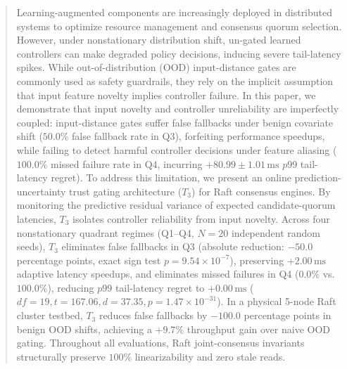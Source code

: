 \begin{abstract}
Learning-augmented components are increasingly deployed in distributed systems to optimize resource management and consensus quorum selection. However, under nonstationary distribution shift, un-gated learned controllers can make degraded policy decisions, inducing severe tail-latency spikes. While out-of-distribution (OOD) input-distance gates are commonly used as safety guardrails, they rely on the implicit assumption that input feature novelty implies controller failure. In this paper, we demonstrate that input novelty and controller unreliability are imperfectly coupled: input-distance gates suffer false fallbacks under benign covariate shift ($50.0\%$ false fallback rate in Q3), forfeiting performance speedups, while failing to detect harmful controller decisions under feature aliasing ($100.0\%$ missed failure rate in Q4, incurring $+80.99 \pm 1.01\,\text{ms}$ $p99$ tail-latency regret). To address this limitation, we present an online prediction-uncertainty trust gating architecture ($T_3$) for Raft consensus engines. By monitoring the predictive residual variance of expected candidate-quorum latencies, $T_3$ isolates controller reliability from input novelty. Across four nonstationary quadrant regimes (Q1--Q4, $N=20$ independent random seeds), $T_3$ eliminates false fallbacks in Q3 (absolute reduction: $-50.0$ percentage points, exact sign test $p = 9.54 \times 10^{-7}$), preserving $+2.00\,\text{ms}$ adaptive latency speedups, and eliminates missed failures in Q4 ($0.0\%$ vs. $100.0\%$), reducing $p99$ tail-latency regret to $+0.00\,\text{ms}$ ($df=19, t = 167.06, d = 37.35, p = 1.47 \times 10^{-31}$). In a physical 5-node Raft cluster testbed, $T_3$ reduces false fallbacks by $-100.0$ percentage points in benign OOD shifts, achieving a $+9.7\%$ throughput gain over naive OOD gating. Throughout all evaluations, Raft joint-consensus invariants structurally preserve $100\%$ linearizability and zero stale reads.
\end{abstract}
